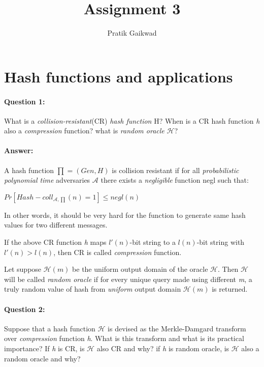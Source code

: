 \documentclass{article}
\title{Assignment 3}
\author{Pratik Gaikwad}
\begin{document}
\maketitle

\section{Hash functions and applications}
    \paragraph{Question 1:} What is a \emph{collision-resistant}(CR) \emph{hash function} H? When is a CR hash function \emph{h} also a \emph{compression} function? what is \emph{random oracle} $\mathcal{H}$?
    
    \paragraph{Answer: \newline}
        A hash function $\prod = (Gen, H)$ is collision resistant if for all \emph{probabilistic polynomial time} adversaries $\mathcal{A}$ there exists a \emph{negligible} function negl such that:
        \begin{center}
            \begin{math}
                Pr[Hash-coll_{\mathcal{A},\prod}(n)=1] \leq negl(n)
            \end{math}            
        \end{center}
        
        In other words, it should be very hard for the function to generate same hash values for two different messages.
        
        If the above CR function \emph{h} maps $\mathit{l}\prime(n)$-bit string to a $\mathit{l}(n)$-bit string with $\mathit{l}\prime(n) > \mathit{l}(n)$, then CR is called \emph{compression} function.
        
        Let suppose $\mathcal{H}(m)$ be the uniform output domain of the oracle $\mathcal{H}$. Then $\mathcal{H}$ will be called \emph{random oracle} if for every unique query made using different \emph{m}, a truly random value of hash from \emph{uniform} output domain $\mathcal{H}(m)$ is returned.
        
    \paragraph{Question 2:} Suppose that a hash function $\mathcal{H}$ is devised as the Merkle-Damgard transform over \emph{compression} function \emph{h}. What is this transform and what is its practical importance? If \emph{h} is CR, is $\mathcal{H}$ also CR and why? if \emph{h} is random oracle, is $\mathcal{H}$ also a random oracle and why?
    
\end{document}
